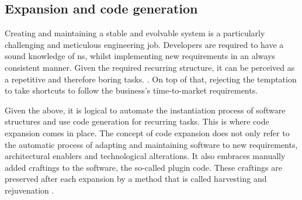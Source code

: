 \subsection{Expansion and code generation} \label{subsec_expansion}

Creating and maintaining a stable and evolvable system is a particularly challenging and
meticulous engineering job. Developers are required to have a sound knowledge of \gls{ns},
whilst implementing new requirements in an always consistent manner. Given the required
recurring structure, it can be perceived as a repetitive and therefore boring tasks.
\parencite[219]{mannaert_normalized_2016}. On top of that, rejecting the temptation to
take shortcuts to follow the business's time-to-market requirements.

Given the above, it is logical to automate the instantiation process of software
structures and use code generation for recurring
tasks\parencite[403]{mannaert_normalized_2016}. This is where code expansion comes in
place. The concept of code expansion does not only refer to the automatic process of
adapting and maintaining software to new requirements, architectural enablers and
technological alterations. It also embraces manually added craftings to the software, the
so-called plugin code. These craftings are preserved after each expansion by a method that
is called harvesting and rejuvenation \parencite[405-406]{mannaert_normalized_2016}.

